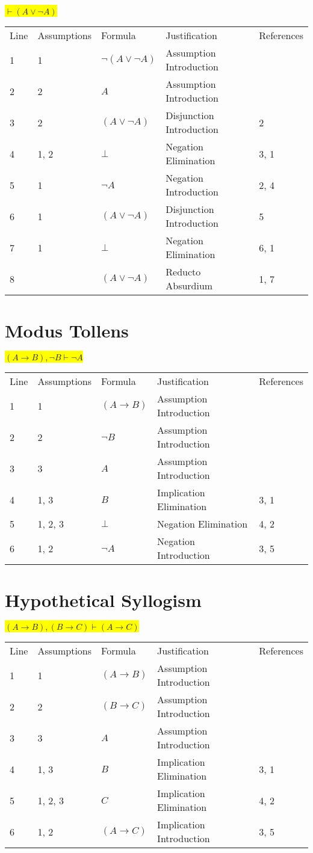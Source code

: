 \documentclass[12pt]{article}
\newcommand{\pr}[1]{\bigbreak \colorbox{Yellow}{$#1$} \smallbreak}
\begin{document}
\begin{flushleft}
\pr{\vdash (A \lor \neg A)}
\begin{tabular}{lllll}
    Line & Assumptions & Formula & Justification & References \\
    1 & 1 & $\neg (A\lor \neg A)$  & Assumption Introduction &  \\
    2 & 2 & $A$  & Assumption Introduction &  \\
    3 & 2 & $(A\lor \neg A)$  & Disjunction Introduction & 2 \\
    4 & 1, 2 & $\bot $  & Negation Elimination & 3, 1 \\
    5 & 1 & $\neg A$  & Negation Introduction & 2, 4 \\
    6 & 1 & $(A\lor \neg A)$  & Disjunction Introduction & 5 \\
    7 & 1 & $\bot $  & Negation Elimination & 6, 1 \\
    8 &  & $(A\lor \neg A)$  & Reducto Absurdium & 1, 7 \\
\end{tabular}

\section{Modus Tollens}
\pr{(A \rightarrow B), \neg B \vdash \neg A}
\begin{tabular}{lllll}
    Line & Assumptions & Formula & Justification & References \\
    1 & 1 & $(A\rightarrow B)$  & Assumption Introduction &  \\
    2 & 2 & $\neg B$  & Assumption Introduction &  \\
    3 & 3 & $A$  & Assumption Introduction &  \\
    4 & 1, 3 & $B$  & Implication Elimination & 3, 1 \\
    5 & 1, 2, 3 & $\bot $  & Negation Elimination & 4, 2 \\
    6 & 1, 2 & $\neg A$  & Negation Introduction & 3, 5 \\
\end{tabular}

\section{Hypothetical Syllogism}
\pr{(A \rightarrow B), (B \rightarrow C) \vdash (A \rightarrow C)}
\begin{tabular}{lllll}
    Line & Assumptions & Formula & Justification & References \\
    1 & 1 & $(A\rightarrow B)$  & Assumption Introduction &  \\
    2 & 2 & $(B\rightarrow C)$  & Assumption Introduction &  \\
    3 & 3 & $A$  & Assumption Introduction &  \\
    4 & 1, 3 & $B$  & Implication Elimination & 3, 1 \\
    5 & 1, 2, 3 & $C$  & Implication Elimination & 4, 2 \\
    6 & 1, 2 & $(A\rightarrow C)$  & Implication Introduction & 3, 5 \\
\end{tabular}


\end{flushleft}
\end{document}
